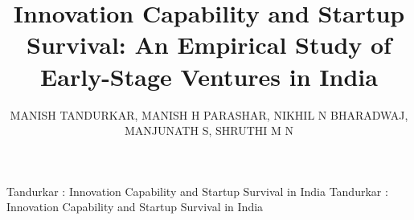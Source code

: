 \documentclass{ieeeaccess}
\begin{document}

\title{Innovation Capability and Startup Survival: An Empirical Study of Early-Stage Ventures in India}

\author{\uppercase{Manish Tandurkar},
\uppercase{Manish H Parashar},
\uppercase{Nikhil N Bharadwaj},
\uppercase{Manjunath S},
\uppercase{Shruthi M N}}

\address[1]{Department of Computer Science \& Engineering, RV College of Engineering, Bengaluru -- 560059, India (e-mail: \{manishtandurkar.cs23, manishhp.cs23, nikhilnb.cs23, manjunaths.cs24\}@rvce.edu.in)}
\address[2]{Department of Industrial Engineering \& Management, RV College of Engineering, Bengaluru -- 560059, India (e-mail: shruthimn@rvce.edu.in)}


\markboth
{Tandurkar \headeretal: Innovation Capability and Startup Survival in India}
{Tandurkar \headeretal: Innovation Capability and Startup Survival in India}

\end{document}
